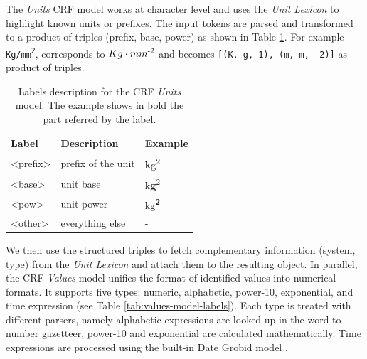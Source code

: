\documentclass[sigconf]{acmart}
\begin{document}
The \textit{Units} CRF model works at character level and uses the \textit{Unit Lexicon} to highlight known units or prefixes. The input tokens are parsed and transformed to a product of triples (prefix, base, power) as shown in Table \ref{tab:units-model-labels}. For example \texttt{Kg/mm\textsuperscript{2}}, corresponds to \texttt{$Kg\cdot mm\textsuperscript{-2}$} and becomes \texttt{[(K, g, 1), (m, m, -2)]} as product of triples. 

\begin{table}[ht]
  \caption{Labels description for the CRF \textit{Units} model. The example shows in bold the part referred by the label. }
  \label{tab:units-model-labels}
  \begin{tabular}{lll}
    \toprule
    Label & Description & Example\\
    \midrule
    <prefix> & prefix of the unit  & \textbf{k}g\textsuperscript{2} \\
    <base> & unit base & k\textbf{g}\textsuperscript{2}\\
    <pow> & unit power & kg\textsuperscript{\textbf{2}}\\
    <other> & everything else & - \\
  \bottomrule
\end{tabular}
\end{table}

We then use the structured triples to fetch complementary information (system, type) from the \textit{Unit Lexicon} and attach them to the resulting object. 
In parallel, the CRF \textit{Values} model unifies the format of identified values into numerical formats. It supports five types: numeric, alphabetic, power-10, exponential, and time expression (see Table \ref{tab:values-model-labels}). Each type is treated with different parsers, namely alphabetic expressions are looked up in the word-to-number gazetteer, power-10 and exponential are calculated mathematically. Time expressions are processed using the built-in Date Grobid model \cite{GROBID}.
\end{document}
